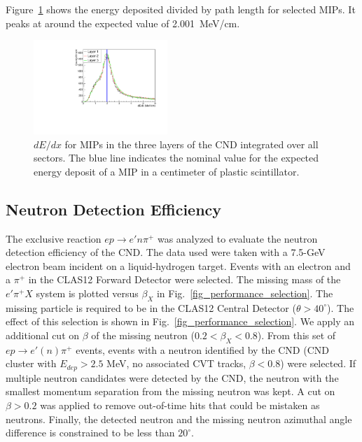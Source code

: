 Figure~\ref{fig_performance_edep} shows the energy deposited divided by path length for selected MIPs. It peaks at around the expected value of 2.001~MeV/cm.

\begin{figure}[htb]  
\begin{center}
\includegraphics[width=0.45\textwidth]{Figure/canENE.pdf}
\caption {$dE/dx$ for MIPs in the three layers of the CND integrated over all sectors. The blue line indicates the nominal value for the expected energy deposit of a MIP in a centimeter of plastic scintillator.}
\label{fig_performance_edep}
\end{center}
\end{figure}

\subsection{Neutron Detection Efficiency}

The exclusive reaction $e p \to e' n \pi^+$ was analyzed to evaluate the neutron detection efficiency of the CND. The data used were taken with a 7.5-GeV electron beam incident on a liquid-hydrogen target. Events with an electron and a $\pi^+$ in the CLAS12 Forward Detector were selected. The missing mass of the $e' \pi^+ X$ system is plotted versus $\beta_X$ in Fig.~\ref{fig_performance_selection}. The missing particle is required to be in the CLAS12 Central Detector ($\theta>40^\circ$). The effect of this selection is shown in Fig.~\ref{fig_performance_selection}. We apply an additional cut on $\beta$ of the missing neutron ($0.2<\beta_X<0.8$). From this set of $e p \to e' (n) \pi^+$ events, events with a neutron identified by the CND (CND cluster with $E_{dep}>2.5$ MeV, no associated CVT tracks, $\beta<0.8$) were selected. If multiple neutron candidates were detected by the CND, the neutron with the smallest momentum separation from the missing neutron was kept. A cut on $\beta>0.2$ was applied to remove out-of-time hits that could be mistaken as neutrons. Finally, the detected neutron and the missing neutron azimuthal angle difference is constrained to be less than $20^\circ$.


